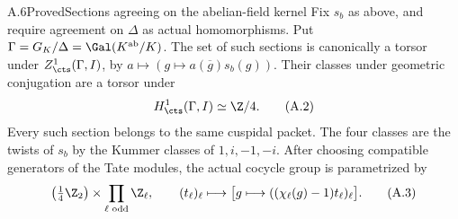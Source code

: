\begin{statement}{A.6}{Proved}{Sections agreeing on the abelian-field kernel}
Fix $s_b$ as above, and require agreement on $\Delta$ as actual homomorphisms.
Put $\Gamma=G_K/\Delta=\Gal(K^{\rm ab}/K)$. The set of such sections
is canonically a torsor under $Z^1_{\cts}(\Gamma,I)$, by
$a\longmapsto(g\mapsto a(\overline g)s_b(g))$. Their classes under
geometric conjugation are a torsor under
\[
                     H^1_{\cts}(\Gamma,I)\simeq\Z/4.     \tag{A.2}
\]
Every such section belongs to the same cuspidal packet. The four classes
are the twists of $s_b$ by the Kummer classes of $1,i,-1,-i$.
After choosing compatible generators of the Tate modules, the actual
cocycle group is parametrized by
\[
 \left(\tfrac14\Z_2\right)\times\prod_{\ell\text{ odd}}\Z_\ell,
 \qquad
 (t_\ell)_\ell\longmapsto
 \bigl[g\longmapsto((\chi_\ell(g)-1)t_\ell)_\ell\bigr]. \tag{A.3}
\]
\end{statement}
